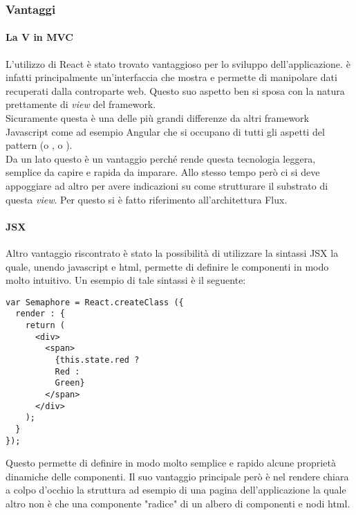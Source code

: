 \subsubsection{Vantaggi}

\paragraph{La V in MVC}\label{just-the-view}
L'utilizzo di React è stato trovato vantaggioso per lo sviluppo dell'applicazione.
\fiscoloMobile{} è infatti principalmente un'interfaccia che mostra e permette di
manipolare dati recuperati dalla controparte web. Questo suo aspetto ben si sposa
con la natura prettamente di \textit{view} del framework. \\

Sicuramente questa è una delle più grandi differenze da altri framework Javascript
come ad esempio Angular che si occupano di tutti gli aspetti del pattern 
(o , o ). \\

Da un lato questo è un vantaggio perché rende questa tecnologia leggera, semplice da
capire e rapida da imparare. Allo stesso tempo però ci si deve appoggiare ad altro
per avere indicazioni su come strutturare il substrato di questa \textit{view}. Per
questo si è fatto riferimento all'architettura Flux. \\

\paragraph{JSX}
Altro vantaggio riscontrato è stato la possibilità di utilizzare la sintassi JSX
la quale, unendo javascript e html, permette di definire le componenti in modo molto
intuitivo. Un esempio di tale sintassi è il seguente:

\begin{verbatim}
var Semaphore = React.createClass ({
  render : {
    return (
      <div>
        <span>
          {this.state.red ?
          Red :
          Green}
        </span>
      </div>	
    );
  }
});
\end{verbatim}

Questo permette di definire in modo molto semplice e rapido alcune proprietà dinamiche
delle componenti. Il suo vantaggio principale però è nel rendere chiara a colpo d'occhio
la struttura ad esempio di una pagina dell'applicazione la quale altro non è che una
componente "radice" di un albero di componenti e nodi html.


